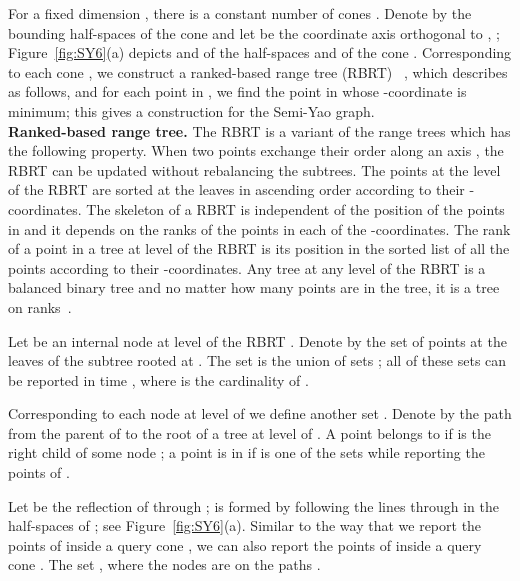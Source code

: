 \documentclass[11pt]{llncs}
\begin{document}
For a fixed dimension , there is a constant number of cones . Denote by  the bounding half-spaces of the cone  and let  be the coordinate axis orthogonal to , ; Figure~\ref{fig:SY6}(a) depicts  and  of the half-spaces  and  of the cone . Corresponding to each cone , we construct a ranked-based range tree (RBRT) ~\cite{Abam:2011:KSX:1971362.1971367}, which describes as follows, and for each point  in , we find the point in  whose -coordinate is minimum; this gives a construction for the Semi-Yao graph. \\
\textbf{Ranked-based range tree.} The RBRT  is a variant of the range trees which has the following property. When two points exchange their order along an axis , the RBRT can be updated without rebalancing the subtrees. The points at the level  of the RBRT  are sorted at the leaves in ascending order according to their -coordinates. The skeleton of a RBRT is independent of the position of the points in  and it depends on the ranks of the points in each of the -coordinates. The rank of a point in a tree at level  of the RBRT is its position in the sorted list of all the points according to their -coordinates. Any tree at any level of the RBRT is a balanced binary tree and no matter how many points are in the tree, it is a tree on  ranks~\cite{Abam:2011:KSX:1971362.1971367}.


Let  be an internal node at level  of the RBRT . Denote by  the set of points at the leaves of the subtree rooted at .  The set  is the union of  sets ; all of these  sets can be reported in time , where  is the cardinality of . 

Corresponding to each node  at level  of  we define another set . Denote by  the path from the parent of  to the root of a tree at level  of . A point  belongs to  if  is the right child of some node ; a point  is in  if  is one of the  sets while reporting the points of .

Let  be the reflection of  through ;  is formed by following the lines through  in the half-spaces of ; see Figure~\ref{fig:SY6}(a). Similar to the way that we report the points of  inside a query cone , we can also report the points of  inside a query cone . The set , where the nodes  are on the paths .
\end{document}
